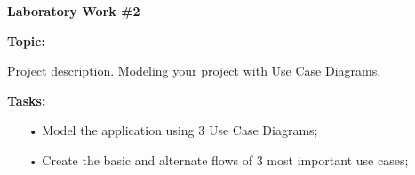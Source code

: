 \graphicspath{ {pic/} }
\begin{flushleft}
\setlength{\parindent}{2ex}\par
\textbf{Laboratory Work \#2} \par
\textbf{Topic:}\par
Project description. Modeling your project with Use Case Diagrams.\par
\textbf{Tasks:}
\begin{enumerate}
\item[•] Model the application using 3 Use Case Diagrams;
\item[•] Create the basic and alternate flows of 3 most important use cases;
\end{enumerate}
\end{flushleft}
\clearpage